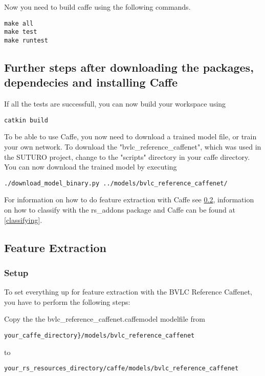 \documentclass[main.tex]{subfiles}
\begin{document}
 	
Now you need to build caffe using the following commands.
\begin{lstlisting}
make all
make test
make runtest  
\end{lstlisting}

\subsection{Further steps after downloading the packages, dependecies and installing Caffe}


If all the tests are successfull, you can now build your workspace using
\begin{lstlisting}
catkin build
\end{lstlisting}

To be able to use Caffe, you now need to download a trained model file, or train your own network. To download the "bvlc\_reference\_caffenet", which was used in the SUTURO project, change to the "scripts" directory in your caffe directory. You can now download the trained model by executing

\begin{lstlisting}
./download_model_binary.py ../models/bvlc_reference_caffenet/
\end{lstlisting}



For information on how to do feature extraction with Caffe see \ref{feature_extraction}, information on how to classify with the rs\_addons package and Caffe can be found at \ref{classifying}. 

\subsection{Feature Extraction} \label{feature_extraction}
\subsubsection{Setup}
To set everything up for feature extraction with the BVLC Reference Caffenet, you have to perform the following steps:

Copy the the bvlc\_reference\_caffenet.caffemodel modelfile from 
\begin{lstlisting}
your_caffe_directory}/models/bvlc_reference_caffenet
\end{lstlisting}

 to
 
\begin{lstlisting}
your_rs_resources_directory/caffe/models/bvlc_reference_caffenet
\end{lstlisting}
\end{document}
